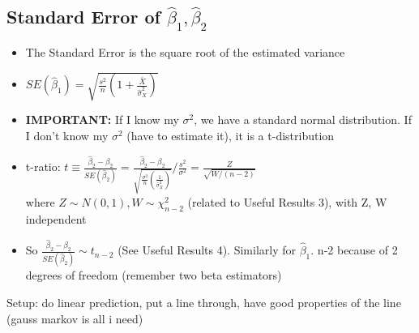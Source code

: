 \documentclass[10pt, oneside]{article}
\begin{document}
\subsection{Standard Error of $\hat \beta_1, \hat \beta_2$}
\begin{itemize}
    \item The Standard Error is the square root of the estimated variance
    \item $SE(\hat \beta_1) = \sqrt{\frac{s^2}{n} (1+ \frac{\bar X}{\hat \sigma^2_X})}$
    \item \textbf{IMPORTANT:} If I know my $\sigma^2$, we have a standard normal distribution. If I don't know my $\sigma^2$ (have to estimate it), it is a t-distribution
    \item t-ratio: $t\equiv \frac{\hat \beta_2 - \beta_2}{SE(\hat \beta_2)}=\frac{\hat \beta_2 - \beta_2}{\sqrt{\frac{\sigma^2}{n} (\frac{1}{\hat \sigma ^2_X})}} / \frac{s^2}{\sigma^2} = \frac{Z}{\sqrt{W/(n-2)}}$\\
    where $Z\sim N(0,1),W\sim \chi_{n-2}^2$ (related to Useful Results 3), with Z, W independent
    \item So $\frac{\hat \beta_2 - \beta_2}{SE(\hat \beta_2)} \sim t_{n-2}$ (See Useful Results 4). Similarly for $\hat \beta_1$. n-2 because of 2 degrees of freedom (remember two beta estimators)
\end{itemize}


Setup: do linear prediction, put a line through, have good properties of the line (gauss markov is all i need)
\end{document}
